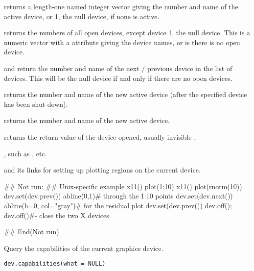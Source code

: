 \begin{Value}
 returns a length-one named integer vector giving the
number and name of the active device, or 1, the null device, if none
is active.

 returns the numbers of all open devices, except device
1, the null device.  This is a numeric vector with a
 attribute giving the device names, or  is
there is no open device.

 and  return the number and name of the
next / previous device in the list of devices.  This will be the null
device if and only if there are no open devices.

 returns the number and name of the new active device
(after the specified device has been shut down).

 returns the number and name of the new active device.

 returns the return value of the device opened, usually
invisible .
\end{Value}
%
\begin{SeeAlso}\relax
{}, such as , etc.

 and its links for setting up plotting regions
on the current device.
\end{SeeAlso}
%
\begin{Examples}
\begin{ExampleCode}
## Not run: ## Unix-specific example
x11()
plot(1:10)
x11()
plot(rnorm(10))
dev.set(dev.prev())
abline(0,1)# through the 1:10 points
dev.set(dev.next())
abline(h=0, col="gray")# for the residual plot
dev.set(dev.prev())
dev.off(); dev.off()#- close the two X devices

## End(Not run)
\end{ExampleCode}
\end{Examples}
%
\begin{Description}\relax
Query the capabilities of the current graphics device.
\end{Description}
%
\begin{Usage}
\begin{verbatim}
dev.capabilities(what = NULL)
\end{verbatim}
\end{Usage}
